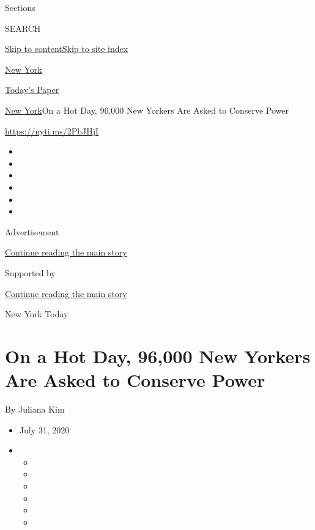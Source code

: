 Sections

SEARCH

\protect\hyperlink{site-content}{Skip to
content}\protect\hyperlink{site-index}{Skip to site index}

\href{https://www.nytimes3xbfgragh.onion/section/nyregion}{New York}

\href{https://myaccount.nytimes3xbfgragh.onion/auth/login?response_type=cookie\&client_id=vi}{}

\href{https://www.nytimes3xbfgragh.onion/section/todayspaper}{Today's
Paper}

\href{/section/nyregion}{New York}\textbar{}On a Hot Day, 96,000 New
Yorkers Are Asked to Conserve Power

\url{https://nyti.ms/2PbJHjI}

\begin{itemize}
\item
\item
\item
\item
\item
\item
\end{itemize}

Advertisement

\protect\hyperlink{after-top}{Continue reading the main story}

Supported by

\protect\hyperlink{after-sponsor}{Continue reading the main story}

New York Today

\hypertarget{on-a-hot-day-96000-new-yorkers-are-asked-to-conserve-power}{%
\section{On a Hot Day, 96,000 New Yorkers Are Asked to Conserve
Power}\label{on-a-hot-day-96000-new-yorkers-are-asked-to-conserve-power}}

By Juliana Kim

\begin{itemize}
\item
  July 31, 2020
\item
  \begin{itemize}
  \item
  \item
  \item
  \item
  \item
  \item
  \end{itemize}
\end{itemize}

